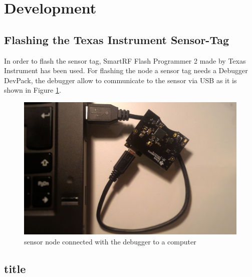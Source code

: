 \section{Development}

\subsection{Flashing the Texas Instrument Sensor-Tag}
In order to flash the sensor tag, SmartRF Flash Programmer 2 made by Texas Instrument has been used. For flashing the node a sensor tag needs a Debugger DevPack, the debugger allow to communicate to the sensor via USB as it is shown in Figure \ref{fig:debug}.  
\begin{figure}[!h]
	\begin{center}
		\includegraphics[width=0.8\linewidth]{debugger}
		\caption{sensor node connected with the debugger to a computer}
		\label{fig:debug}
	\end{center}
	
\end{figure} 

\subsection{title}